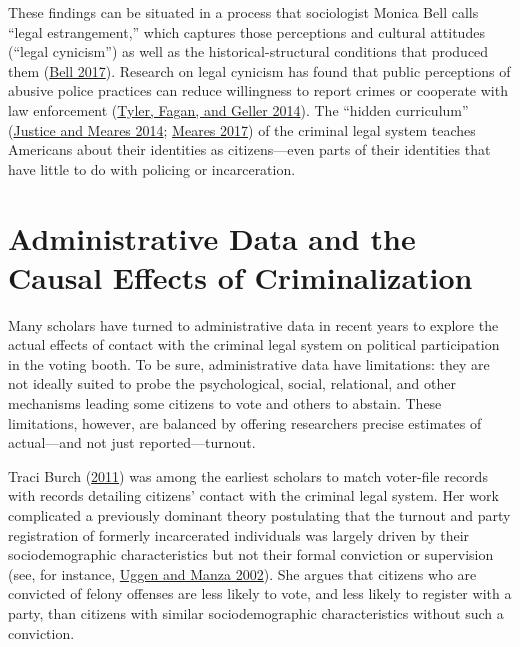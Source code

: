 \documentclass[
  12pt,
]{article}
\begin{document}
These findings can be situated in a process that sociologist Monica Bell calls ``legal estrangement,'' which captures those perceptions and cultural attitudes (``legal cynicism'') as well as the historical-structural conditions that produced them (\protect\hyperlink{ref-Bell2017}{Bell 2017}). Research on legal cynicism has found that public perceptions of abusive police practices can reduce willingness to report crimes or cooperate with law enforcement (\protect\hyperlink{ref-Tyler2014}{Tyler, Fagan, and Geller 2014}). The ``hidden curriculum'' (\protect\hyperlink{ref-Justice2014}{Justice and Meares 2014}; \protect\hyperlink{ref-Meares2017}{Meares 2017}) of the criminal legal system teaches Americans about their identities as citizens---even parts of their identities that have little to do with policing or incarceration.

\hypertarget{administrative-data-and-the-causal-effects-of-criminalization}{%
\section*{Administrative Data and the Causal Effects of Criminalization}\label{administrative-data-and-the-causal-effects-of-criminalization}}

Many scholars have turned to administrative data in recent years to explore the actual effects of contact with the criminal legal system on political participation in the voting booth. To be sure, administrative data have limitations: they are not ideally suited to probe the psychological, social, relational, and other mechanisms leading some citizens to vote and others to abstain. These limitations, however, are balanced by offering researchers precise estimates of actual---and not just reported---turnout.

Traci Burch (\protect\hyperlink{ref-Burch2011}{2011}) was among the earliest scholars to match voter-file records with records detailing citizens' contact with the criminal legal system. Her work complicated a previously dominant theory postulating that the turnout and party registration of formerly incarcerated individuals was largely driven by their sociodemographic characteristics but not their formal conviction or supervision (see, for instance, \protect\hyperlink{ref-Uggen2002}{Uggen and Manza 2002}). She argues that citizens who are convicted of felony offenses are less likely to vote, and less likely to register with a party, than citizens with similar sociodemographic characteristics without such a conviction.
\end{document}
